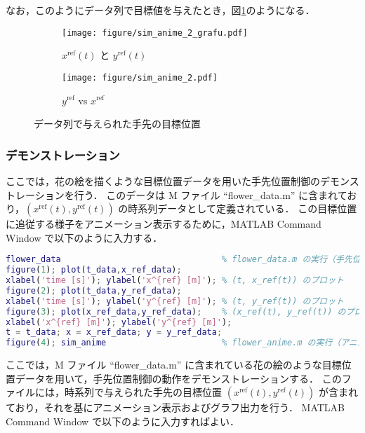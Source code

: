 なお，このようにデータ列で目標値を与えたとき，図\ref{fig:xy_ref_data}のようになる．

\begin{figure}[H]
    \centering
    \begin{subfigure}[b]{0.45\linewidth}
        \centering
        \texttt{[image: figure/sim\_anime\_2\_grafu.pdf]}
        \caption{$x^{\mathrm{ref}}(t)$ と $y^{\mathrm{ref}}(t)$}
    \end{subfigure}
    \begin{subfigure}[b]{0.45\linewidth}
        \centering
        \texttt{[image: figure/sim\_anime\_2.pdf]}
        \caption{$y^{\mathrm{ref}}$ vs $x^{\mathrm{ref}}$}
    \end{subfigure}
    \caption{データ列で与えられた手先の目標位置}
    \label{fig:xy_ref_data}
\end{figure}

\subsubsection{デモンストレーション}

ここでは，花の絵を描くような目標位置データを用いた手先位置制御のデモンストレーションを行う．
このデータは M ファイル ``flower\_data.m'' に含まれており，$(x^{\mathrm{ref}}(t), y^{\mathrm{ref}}(t))$ の時系列データとして定義されている．
この目標位置に追従する様子をアニメーション表示するために，MATLAB Command Window で以下のように入力する．

\begin{lstlisting}[language=Matlab]
flower_data                                % flower_data.m の実行（手先位置の目標値設定）
figure(1); plot(t_data,x_ref_data); 
xlabel('time [s]'); ylabel('x^{ref} [m]'); % (t, x_ref(t)) のプロット
figure(2); plot(t_data,y_ref_data); 
xlabel('time [s]'); ylabel('y^{ref} [m]'); % (t, y_ref(t)) のプロット
figure(3); plot(x_ref_data,y_ref_data);    % (x_ref(t), y_ref(t)) のプロット
xlabel('x^{ref} [m]'); ylabel('y^{ref} [m]');
t = t_data; x = x_ref_data; y = y_ref_data;
figure(4); sim_anime                       % flower_anime.m の実行（アニメーション）
\end{lstlisting}

ここでは，M ファイル ``flower\_data.m'' に含まれている花の絵のような目標位置データを用いて，手先位置制御の動作をデモンストレーションする．
このファイルには，時系列で与えられた手先の目標位置 $(x^{\mathrm{ref}}(t), y^{\mathrm{ref}}(t))$ が含まれており，それを基にアニメーション表示およびグラフ出力を行う．
MATLAB Command Window で以下のように入力すればよい．


